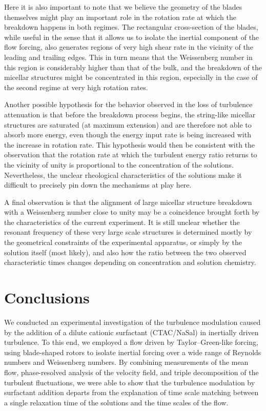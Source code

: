 \documentclass[aps,prfluids,groupedaddress,showkeys,11pt,tightenlines]{revtex4-2}
\begin{document}
Here it is also important to note that we believe the geometry of the blades themselves might play an important role in the rotation rate at which the breakdown happens in both regimes. The rectangular cross-section of the blades, while useful in the sense that it allows us to isolate the inertial component of the flow forcing, also generates regions of very high shear rate in the vicinity of the leading and trailing edges. This in turn means that the Weissenberg number in this region is considerably higher than that of the bulk, and the breakdown of the micellar structures might be concentrated in this region, especially in the case of the second regime at very high rotation rates.

Another possible hypothesis for the behavior observed in the loss of turbulence attenuation is that before the breakdown process begins, the string-like micellar structures are saturated (at maximum extension) and are therefore not able to absorb more energy, even though the energy input rate is being increased with the increase in rotation rate. This hypothesis would then be consistent with the observation that the rotation rate at which the turbulent energy ratio returns to the vicinity of unity is proportional to the concentration of the solutions. Nevertheless, the unclear rheological characteristics of the solutions make it difficult to precisely pin down the mechanisms at play here.

A final observation is that the alignment of large micellar structure breakdown with a Weissenberg number close to unity may be a coincidence brought forth by the characteristics of the current experiment. It is still unclear whether the resonant frequency of these very large scale structures is determined mostly by the geometrical constraints of the experimental apparatus, or simply by the solution itself (most likely), and also how the ratio between the two observed characteristic times changes depending on concentration and solution chemistry.

\section{Conclusions\label{sec:Conclus}}

We conducted an experimental investigation of the turbulence modulation caused by the addition of a dilute cationic surfactant (CTAC/NaSal) in inertially driven turbulence. To this end, we employed a flow driven by Taylor--Green-like forcing, using blade-shaped rotors to isolate inertial forcing over a wide range of Reynolds numbers and Weissenberg numbers. By combining measurements of the mean flow, phase-resolved analysis of the velocity field, and triple decomposition of the turbulent fluctuations, we were able to show that the turbulence modulation by surfactant addition departs from the explanation of time scale matching between a single relaxation time of the solutions and the time scales of the flow.
\end{document}
